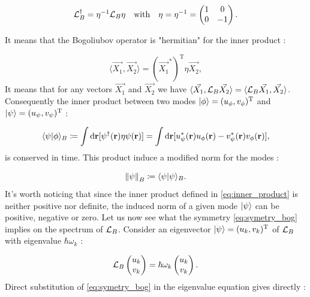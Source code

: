 \begin{equation}
    \Lbog^\dagger = \eta^{-1} \Lbog \eta \ \ \ \mathrm{with} \ \ \ \eta = \eta^{-1} =\begin{pmatrix}
        1 & 0 \\
        0 & -1
    \end{pmatrix}.
    \label{eq:symetry_bog}
\end{equation}

It means that the Bogoliubov operator is "hermitian" for the inner product :

\begin{equation}
    \langle \vec{X_1},\vec{X_2} \rangle = (\vec{X_1}^*)^{\mathrm{T}} \eta \vec{X_2},
    \label{eq:inner_product}
\end{equation}
It means that for any vectors $\vec{X_1}$ and $\vec{X_2}$ we have $\langle \vec{X_1},\mathcal{L}_B\vec{X_2} \rangle = \langle \mathcal{L}_B\vec{X_1},\vec{X_2} \rangle$. 
Consequently the inner product between two modes $\ket{\phi}= (u_{\phi}, v_{\phi})^\mathrm{T}$ and $\ket{\psi}=(u_{\psi}, v_{\psi})^\mathrm{T}$ :

\begin{equation}
    \langle \psi| \phi \rangle_B \coloneqq \int \mathrm{d}\mathbf{r}[\psi^\dagger(\mathbf{r})\eta\psi(\mathbf{r})] = \int \mathrm{d}\mathbf{r}[u_{\psi}^*(\mathbf{r})u_{\phi}(\mathbf{r})-v_{\psi}^*(\mathbf{r})v_{\phi}(\mathbf{r})],
    \label{eq:inner_product}
\end{equation}
is conserved in time. This product induce a modified norm for the modes : 

\begin{equation}
    \norm{\psi}_{B}\coloneqq \langle \psi| \psi \rangle_B.
    \label{eq:modified_norm}
\end{equation}
It's worth noticing that since the inner product defined in \autoref{eq:inner_product} is neither positive nor definite, the induced norm of a given mode $\ket{\psi}$
can be positive, negative or zero. Let us now see what the symmetry \autoref{eq:symetry_bog} implies on the spectrum of $\mathcal{L}_B$. Consider an eigenvector $\ket{\psi}= (u_k,v_k)^\mathrm{T}$ of $\mathcal{L}_B$ with eigenvalue $\hbar\omega_k$ : 

\begin{equation}
    \mathcal{L}_B \begin{pmatrix}
        u_k \\
        v_k
    \end{pmatrix} = \hbar\omega_k \begin{pmatrix}
        u_k \\
        v_k
    \end{pmatrix}.
\end{equation}
Direct substitution of \autoref{eq:symetry_bog} in the eigenvalue equation gives directly :

